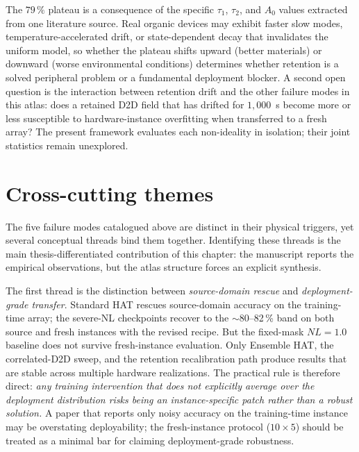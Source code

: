 The $79\,\%$ plateau is a consequence of the specific $\tau_{1}$, $\tau_{2}$, and $A_{0}$ values extracted from one literature source.  Real organic devices may exhibit faster slow modes, temperature-accelerated drift, or state-dependent decay that invalidates the uniform model, so whether the plateau shifts upward (better materials) or downward (worse environmental conditions) determines whether retention is a solved peripheral problem or a fundamental deployment blocker.  A second open question is the interaction between retention drift and the other failure modes in this atlas: does a retained D2D field that has drifted for $1{,}000$~s become more or less susceptible to hardware-instance overfitting when transferred to a fresh array?  The present framework evaluates each non-ideality in isolation; their joint statistics remain unexplored.


\section{Cross-cutting themes}
\label{sec:cross-cutting-themes}

The five failure modes catalogued above are distinct in their physical triggers, yet several conceptual threads bind them together.  Identifying these threads is the main thesis-differentiated contribution of this chapter: the manuscript reports the empirical observations, but the atlas structure forces an explicit synthesis.

The first thread is the distinction between \emph{source-domain rescue} and \emph{deployment-grade transfer}.  Standard HAT rescues source-domain accuracy on the training-time array; the severe-NL checkpoints recover to the $\sim$80--82\,\% band on both source and fresh instances with the revised recipe.  But the fixed-mask $NL=1.0$ baseline does not survive fresh-instance evaluation.  Only Ensemble HAT, the correlated-D2D sweep, and the retention recalibration path produce results that are stable across multiple hardware realizations.  The practical rule is therefore direct: \emph{any training intervention that does not explicitly average over the deployment distribution risks being an instance-specific patch rather than a robust solution.}  A paper that reports only noisy accuracy on the training-time instance may be overstating deployability; the fresh-instance protocol ($10 \times 5$) should be treated as a minimal bar for claiming deployment-grade robustness.

